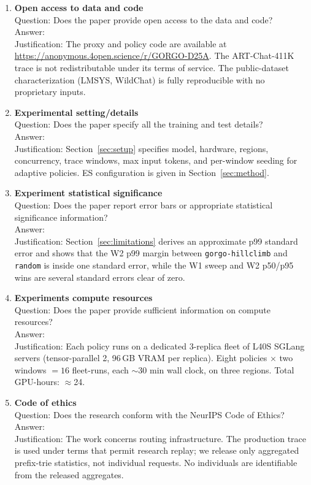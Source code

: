 \documentclass{article}
\begin{document}
\begin{enumerate}
\item {\bf Open access to data and code}\\
Question: Does the paper provide open access to the data and code?\\
Answer: \answerYes{}\\
Justification: The proxy and policy code are available at \href{https://anonymous.4open.science/r/GORGO-D25A}{https://anonymous.4open.science/r/GORGO-D25A}. The ART-Chat-411K trace is not redistributable under its terms of service. The public-dataset characterization (LMSYS, WildChat) is fully reproducible with no proprietary inputs.

\item {\bf Experimental setting/details}\\
Question: Does the paper specify all the training and test details?\\
Answer: \answerYes{}\\
Justification: Section~\ref{sec:setup} specifies model, hardware, regions, concurrency, trace windows, max input tokens, and per-window seeding for adaptive policies. ES configuration is given in Section~\ref{sec:method}.

\item {\bf Experiment statistical significance}\\
Question: Does the paper report error bars or appropriate statistical significance information?\\
Answer: \answerYes{}\\
Justification: Section~\ref{sec:limitations} derives an approximate p99 standard error and shows that the W2 p99 margin between \texttt{gorgo-hillclimb} and \texttt{random} is inside one standard error, while the W1 sweep and W2 p50/p95 wins are several standard errors clear of zero.

\item {\bf Experiments compute resources}\\
Question: Does the paper provide sufficient information on compute resources?\\
Answer: \answerYes{}\\
Justification: Each policy runs on a dedicated 3-replica fleet of L40S SGLang servers (tensor-parallel 2, 96\,GB VRAM per replica). Eight policies $\times$ two windows $= 16$ fleet-runs, each $\sim$30 min wall clock, on three regions. Total GPU-hours: $\approx$24.

\item {\bf Code of ethics}\\
Question: Does the research conform with the NeurIPS Code of Ethics?\\
Answer: \answerYes{}\\
Justification: The work concerns routing infrastructure. The production trace is used under terms that permit research replay; we release only aggregated prefix-trie statistics, not individual requests. No individuals are identifiable from the released aggregates.


\end{enumerate}
\end{document}
